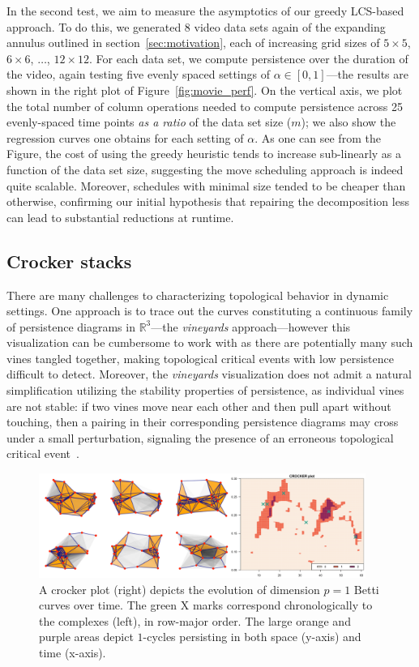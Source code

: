 \documentclass[sn-mathphys]{sn-jnl}
\begin{document}
In the second test, we aim to measure the asymptotics of our greedy LCS-based approach. To do this, we generated 8 video data sets again of the expanding annulus outlined in section~\ref{sec:motivation}, each of increasing grid sizes of $5 \times 5$, $6 \times 6$, $\dots$, $12 \times 12$. For each data set, we compute persistence over the duration of the video, again testing five evenly spaced settings of $\alpha \in [0,1]$---the results are shown in the right plot of Figure~\ref{fig:movie_perf}. On the vertical axis, we plot the total number of column operations needed to compute persistence across 25 evenly-spaced time points \emph{as a ratio} of the data set size ($m$); we also show the regression curves one obtains for each setting of $\alpha$. As one can see from the Figure, the cost of using the greedy heuristic tends to increase sub-linearly as a function of the data set size, suggesting the move scheduling approach is indeed quite scalable. Moreover, schedules with minimal size tended to be cheaper than otherwise, confirming our initial hypothesis that repairing the decomposition less can lead to substantial reductions at runtime.  

\subsection{Crocker stacks}
There are many challenges to characterizing topological behavior in dynamic settings. One approach is to trace out the curves constituting a continuous family of persistence diagrams in $\mathbb{R}^3$---the \emph{vineyards} approach---however this visualization can be cumbersome to work with as there are potentially many such vines tangled together, making topological critical events with low persistence difficult to detect. Moreover, the \emph{vineyards} visualization does not admit a natural simplification utilizing the stability properties of persistence, as individual vines are not stable: if two vines move near each other and then pull apart without touching, then a pairing in their corresponding persistence diagrams may cross under a small perturbation, signaling the presence of an erroneous topological critical event~\cite{topaz2015topological, xian2020capturing}. 

\begin{figure}[t]
	\centering
	\includegraphics[width=0.95\textwidth]{crocker_combo_1.png}
	\caption{A crocker plot (right) depicts the evolution of dimension $p = 1$ Betti curves over time. The green $\mathrm{X}$ marks correspond chronologically to the complexes (left), in row-major order. The large orange and purple areas depict $1$-cycles persisting in both space (y-axis) and time (x-axis).} \label{fig:crocker1}
\end{figure}
\end{document}
